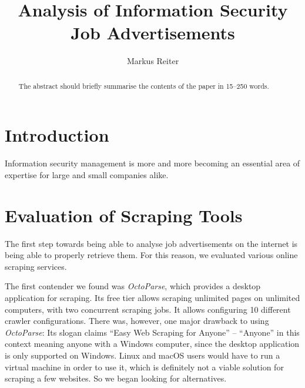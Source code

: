 \documentclass[runningheads]{llncs}
\begin{document}
\title{Analysis of Information Security Job Advertisements}

\author{Markus Reiter}


\maketitle

\newpage

\begin{abstract}
The abstract should briefly summarise the contents of the paper in
15--250 words.


\end{abstract}

\newpage

\section{Introduction}
\label{sec:introduction}

Information security management is more and more becoming an essential area of expertise for large and small companies alike.

\section{Evaluation of Scraping Tools}
\label{sec:evaluation_of_scraping_tools}

The first step towards being able to analyse job advertisements on the internet is being able to properly retrieve them. For this reason, we evaluated various online scraping services.

The first contender we found was \textit{OctoParse}, which provides a desktop application for scraping. Its free tier allows scraping unlimited pages on unlimited computers, with two concurrent scraping jobs. It allows configuring 10 different crawler configurations. There was, however, one major drawback to using \textit{OctoParse}: Its slogan claims “Easy Web Scraping for Anyone” – “Anyone” in this context meaning anyone with a Windows computer, since the desktop application is only supported on Windows. Linux and macOS users would have to run a virtual machine in order to use it, which is definitely not a viable solution for scraping a few websites. So we began looking for alternatives.
\end{document}
